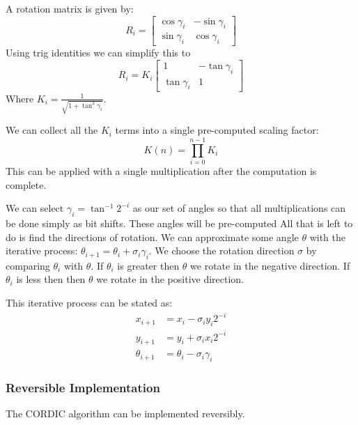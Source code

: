         A rotation matrix is given by:
        \[
          R_i = \begin{bmatrix}
            \cos\gamma_i & -\sin\gamma_i \\
            \sin\gamma_i & \cos\gamma_i
          \end{bmatrix}
        \]
        Using trig identities we can simplify this to
        \[
          R_i = K_i
                \begin{bmatrix}
                  1            & -\tan\gamma_i \\
                  \tan\gamma_i & 1
                \end{bmatrix}
        \]
        Where $K_i = \frac{1}{\sqrt{1+\tan^2\gamma_i}}$.

        We can collect all the $K_i$ terms into a single pre-computed scaling factor:
        \[ K(n) = \prod_{i=0}^{n-1}K_i \]
        This can be applied with a single multiplication after the computation is complete.

        We can select $\gamma_i = \tan^{-1}2^{-i}$ as our set of angles so that all multiplications can be done simply as bit shifts.
        These angles will be pre-computed
        All that is left to do is find the directions of rotation.
        We can approximate some angle $\theta$ with the iterative process: $\theta_{i+1} = \theta_i + \sigma_i\gamma_i$.
        We choose the rotation direction $\sigma$ by comparing $\theta_i$ with $\theta$.
        If $\theta_i$ is greater then $\theta$ we rotate in the negative direction.
        If $\theta_i$ is less then then $\theta$ we rotate in the positive direction.

        This iterative process can be stated as:
        \begin{equation}\label{eq:cordIter}
            \begin{aligned}
                x_{i+1}      &= x_i - \sigma_iy_i2^{-i}\\
                y_{i+1}      &= y_i + \sigma_ix_i2^{-i}\\
                \theta_{i+1} &= \theta_i - \sigma_i\gamma_i
            \end{aligned}
        \end{equation}

    \subsubsection{Reversible Implementation}
        The CORDIC algorithm can be implemented reversibly.

